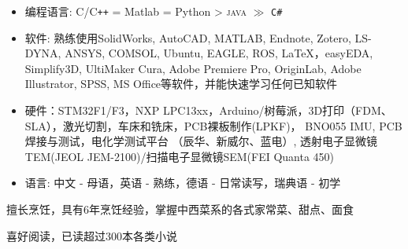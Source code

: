 {}
\begin{itemize}[parsep=0.5ex]
  \item 编程语言: C/C\texttt{++} = Matlab = Python > \textsc{java} $\gg$ \texttt{C\#}
  \item 软件: 熟练使用SolidWorks, AutoCAD, MATLAB, Endnote, Zotero, LS-DYNA, ANSYS, COMSOL, Ubuntu, EAGLE, ROS, \LaTeX，easyEDA, Simplify3D, UltiMaker Cura, Adobe Premiere Pro, OriginLab, Adobe Illustrator, SPSS, MS Office等软件，并能快速学习任何已知软件
  \item 硬件：STM32F1/F3，NXP LPC13xx，Arduino/树莓派，3D打印（FDM、SLA），激光切割，车床和铣床，PCB裸板制作(LPKF)， BNO055 IMU, PCB焊接与测试，电化学测试平台 （辰华、新威尔、蓝电）, 透射电子显微镜TEM(JEOL JEM-2100)/扫描电子显微镜SEM(FEI Quanta 450)
  \item 语言: 中文 - 母语，英语 - 熟练，德语 - 日常读写，瑞典语 - 初学
\end{itemize}



\par 擅长烹饪，具有6年烹饪经验，掌握中西菜系的各式家常菜、甜点、面食
\par 喜好阅读，已读超过300本各类小说
\label{LastPage}

